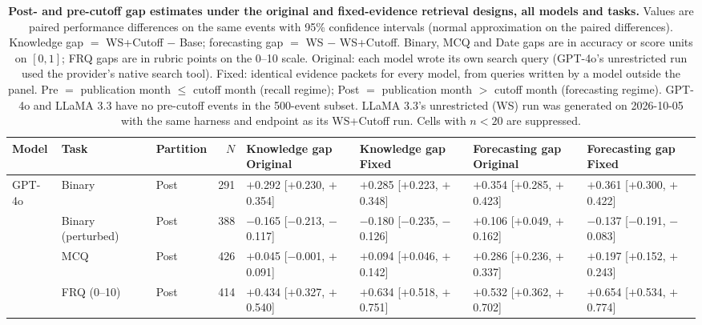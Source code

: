 \begin{table}[p]
\centering
\footnotesize
\caption{\textbf{Post- and pre-cutoff gap estimates under the original and fixed-evidence retrieval designs, all models and tasks.} Values are paired performance differences on the same events with 95\% confidence intervals (normal approximation on the paired differences). Knowledge gap $=$ WS+Cutoff $-$ Base; forecasting gap $=$ WS $-$ WS+Cutoff. Binary, MCQ and Date gaps are in accuracy or score units on $[0,1]$; FRQ gaps are in rubric points on the 0--10 scale. Original: each model wrote its own search query (GPT-4o's unrestricted run used the provider's native search tool). Fixed: identical evidence packets for every model, from queries written by a model outside the panel. Pre $=$ publication month $\le$ cutoff month (recall regime); Post $=$ publication month $>$ cutoff month (forecasting regime). GPT-4o and LLaMA 3.3 have no pre-cutoff events in the 500-event subset. LLaMA 3.3's unrestricted (WS) run was generated on 2026-10-05 with the same harness and endpoint as its WS+Cutoff run. Cells with $n<20$ are suppressed.}
\label{tab:gaps_full}
\begin{tabular}{l l l r l l l l}
\toprule
Model & Task & Partition & $N$ & \makecell[l]{Knowledge gap\\Original} & \makecell[l]{Knowledge gap\\Fixed} & \makecell[l]{Forecasting gap\\Original} & \makecell[l]{Forecasting gap\\Fixed} \\
\midrule
GPT-4o & Binary & Post & 291 & $+$0.292 {\scriptsize[$+$0.230, $+$0.354]} & $+$0.285 {\scriptsize[$+$0.223, $+$0.348]} & $+$0.354 {\scriptsize[$+$0.285, $+$0.423]} & $+$0.361 {\scriptsize[$+$0.300, $+$0.422]} \\
 & Binary (perturbed) & Post & 388 & $-$0.165 {\scriptsize[$-$0.213, $-$0.117]} & $-$0.180 {\scriptsize[$-$0.235, $-$0.126]} & $+$0.106 {\scriptsize[$+$0.049, $+$0.162]} & $-$0.137 {\scriptsize[$-$0.191, $-$0.083]} \\
 & MCQ & Post & 426 & $+$0.045 {\scriptsize[$-$0.001, $+$0.091]} & $+$0.094 {\scriptsize[$+$0.046, $+$0.142]} & $+$0.286 {\scriptsize[$+$0.236, $+$0.337]} & $+$0.197 {\scriptsize[$+$0.152, $+$0.243]} \\
 & FRQ (0--10) & Post & 414 & $+$0.434 {\scriptsize[$+$0.327, $+$0.540]} & $+$0.634 {\scriptsize[$+$0.518, $+$0.751]} & $+$0.532 {\scriptsize[$+$0.362, $+$0.702]} & $+$0.654 {\scriptsize[$+$0.534, $+$0.774]} \\

\end{tabular}
\end{table}
